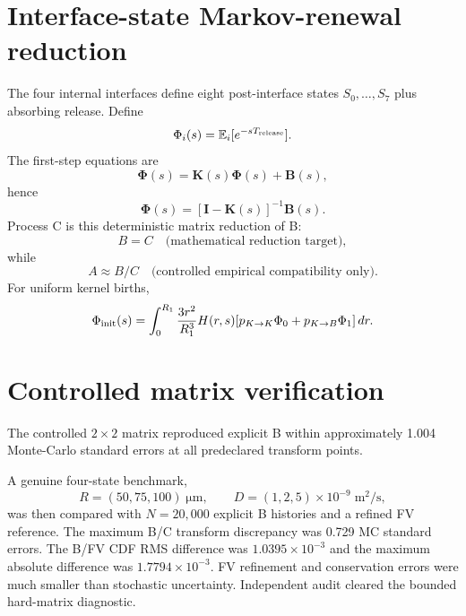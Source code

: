 \documentclass[11pt]{article}
\begin{document}
\section{Interface-state Markov-renewal reduction}
The four internal interfaces define eight post-interface states $S_0,\ldots,S_7$ plus absorbing release. Define
\begin{equation}
\Phi_i(s)=\mathbb E_i[e^{-sT_{\rm release}}].
\end{equation}
The first-step equations are
\begin{equation}
\bm\Phi(s)=\bm K(s)\bm\Phi(s)+\bm B(s),
\end{equation}
hence
\begin{equation}
\boxed{\bm\Phi(s)=[\bm I-\bm K(s)]^{-1}\bm B(s)}.
\label{eq:renewal}
\end{equation}
Process C is this deterministic matrix reduction of B:
\begin{equation}
B=C\quad\text{(mathematical reduction target)},
\end{equation}
while
\begin{equation}
A\approx B/C\quad\text{(controlled empirical compatibility only)}.
\end{equation}
For uniform kernel births,
\begin{equation}
\Phi_{\rm init}(s)=
\int_0^{R_1}\frac{3r^2}{R_1^3}H(r,s)
[p_{K\to K}\Phi_0+p_{K\to B}\Phi_1]\,dr.
\end{equation}

\section{Controlled matrix verification}
The controlled $2\times2$ matrix reproduced explicit B within approximately 1.004 Monte-Carlo standard errors at all predeclared transform points.

A genuine four-state benchmark,
\begin{equation}
R=(50,75,100)\;\si{\micro\metre},\qquad
D=(1,2,5)\times10^{-9}\;\si{\metre\squared\per\second},
\end{equation}
was then compared with $N=20{,}000$ explicit B histories and a refined FV reference. The maximum B/C transform discrepancy was 0.729 MC standard errors. The B/FV CDF RMS difference was $1.0395\times10^{-3}$ and the maximum absolute difference was $1.7794\times10^{-3}$. FV refinement and conservation errors were much smaller than stochastic uncertainty. Independent audit cleared the bounded hard-matrix diagnostic.
\end{document}
